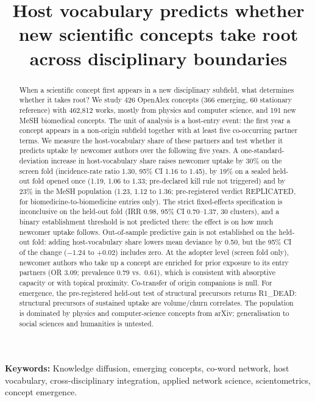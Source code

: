\documentclass[11pt,letterpaper]{article}
\title{Host vocabulary predicts whether new scientific concepts take root across disciplinary boundaries}
\author{}
\date{}
\begin{document}
\maketitle

\begin{abstract}
When a scientific concept first appears in a new disciplinary subfield, what determines whether it takes root?
We study 426 OpenAlex concepts (366 emerging, 60 stationary reference) with 462,812 works, mostly from physics and
computer science, and 191 new MeSH biomedical concepts.
The unit of analysis is a host-entry event: the first year a concept appears in a non-origin subfield together
with at least five co-occurring partner terms. We measure the host-vocabulary share of these partners and test
whether it predicts uptake by newcomer authors over the following five years. A one-standard-deviation increase in host-vocabulary share raises newcomer uptake by 30\% on the screen
fold (incidence-rate ratio 1.30, 95\% CI 1.16 to 1.45), by 19\% on a sealed held-out fold opened once
(1.19, 1.06 to 1.33; pre-declared kill rule not triggered) and by 23\% in the MeSH population
(1.23, 1.12 to 1.36; pre-registered verdict REPLICATED, for biomedicine-to-biomedicine entries only).
The strict fixed-effects specification is inconclusive on the held-out fold
(IRR 0.98, 95\% CI 0.70--1.37, 30 clusters), and a binary establishment threshold is not predicted there:
the effect is on how much newcomer uptake follows. Out-of-sample predictive gain is not established on the held-out fold: adding
host-vocabulary share lowers mean deviance by 0.50, but the 95\% CI of the change ($-1.24$ to $+0.02$) includes
zero. At the adopter level (screen fold only), newcomer authors who take up a concept
are enriched for prior exposure to its entry partners (OR 3.09; prevalence 0.79 vs.\ 0.61), which is consistent
with absorptive capacity or with topical proximity. Co-transfer of origin companions is null. For emergence,
the pre-registered held-out test of structural precursors returns R1\_DEAD: structural precursors of sustained
uptake are volume/churn correlates. The population is dominated by
physics and computer-science concepts from arXiv; generalisation to social sciences and humanities is untested.
\end{abstract}

\noindent\textbf{Keywords:} Knowledge diffusion, emerging concepts, co-word network, host vocabulary,
cross-disciplinary integration, applied network science, scientometrics, concept emergence.
\end{document}
